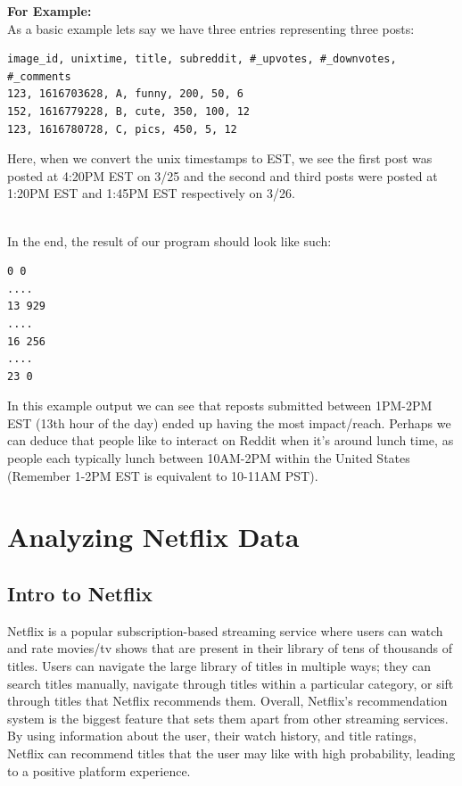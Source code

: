 \documentclass{article}
\begin{document}
\noindent \textbf{For Example:}\\
As a basic example lets say we have three entries representing three posts: 
\begin{Verbatim}[frame=single]
image_id, unixtime, title, subreddit, #_upvotes, #_downvotes, #_comments
123, 1616703628, A, funny, 200, 50, 6
152, 1616779228, B, cute, 350, 100, 12
123, 1616780728, C, pics, 450, 5, 12
\end{Verbatim}
Here, when we convert the unix timestamps to EST, we see the first post was posted at 4:20PM EST on 3/25 and the second and third posts were posted at 1:20PM EST and 1:45PM EST respectively on 3/26.


\-\ \\In the end, the result of our program should look like such:
\begin{Verbatim}[frame=single]
0 0
....
13 929
....
16 256
....
23 0
\end{Verbatim}
In this example output we can see that reposts submitted between 1PM-2PM EST (13th hour of the day) ended up having the most impact/reach. Perhaps we can deduce that people like to interact on Reddit when it's around lunch time, as people each typically lunch between 10AM-2PM within the United States (Remember 1-2PM EST is equivalent to 10-11AM PST). 

\newpage
\section{Analyzing Netflix Data}
\subsection*{Intro to Netflix}
Netflix is a popular subscription-based streaming service where users can watch and rate movies/tv shows that are present in their library of tens of thousands of titles. Users can navigate the large library of titles in multiple ways; they can search titles manually, navigate through titles within a particular category, or sift through titles that Netflix recommends them. Overall, Netflix's recommendation system is the biggest feature that sets them apart from other streaming services. By using information about the user, their watch history, and title ratings, Netflix can recommend titles that the user may like with high probability, leading to a positive platform experience. 
\end{document}
